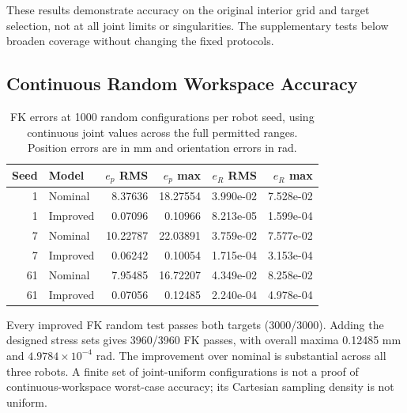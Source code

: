 \documentclass[11pt,letterpaper]{article}
\begin{document}
These results demonstrate accuracy on the original interior grid and target selection, not at all joint limits or singularities. The supplementary tests below broaden coverage without changing the fixed protocols.

\subsection{Continuous Random Workspace Accuracy}
\begin{table}[!htbp]\centering\small
\caption{FK errors at 1000 random configurations per robot seed, using continuous joint values across the full permitted ranges. Position errors are in mm and orientation errors in rad.}\label{tab:random_fk}
\begin{tabular}{@{}rlrrrr@{}}\toprule
Seed & Model & $e_p$ RMS & $e_p$ max & $e_R$ RMS & $e_R$ max\\\midrule
1 & Nominal & 8.37636 & 18.27554 & 3.990e-02 & 7.528e-02\\
1 & Improved & 0.07096 & 0.10966 & 8.213e-05 & 1.599e-04\\
7 & Nominal & 10.22787 & 22.03891 & 3.759e-02 & 7.577e-02\\
7 & Improved & 0.06242 & 0.10054 & 1.715e-04 & 3.153e-04\\
61 & Nominal & 7.95485 & 16.72207 & 4.349e-02 & 8.258e-02\\
61 & Improved & 0.07056 & 0.12485 & 2.240e-04 & 4.978e-04\\
\bottomrule\end{tabular}
\end{table}
Every improved FK random test passes both targets (3000/3000). Adding the designed stress sets gives 3960/3960 FK passes, with overall maxima 0.12485 mm and $4.9784\times10^{-4}$ rad. The improvement over nominal is substantial across all three robots. A finite set of joint-uniform configurations is not a proof of continuous-workspace worst-case accuracy; its Cartesian sampling density is not uniform.
\end{document}
